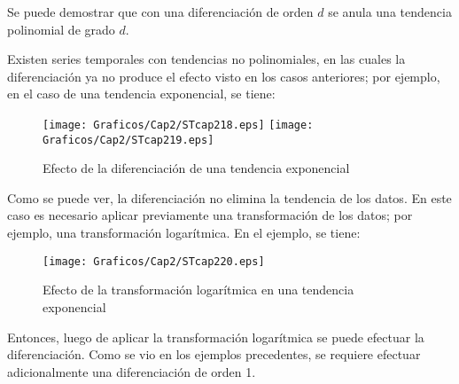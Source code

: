 \begin{observacion}
Se puede demostrar que con una diferenciaci\'{o}n de orden $d$ se anula una tendencia polinomial de grado $d$.
\end{observacion}

\begin{observacion}
Existen series temporales con tendencias no polinomiales, en las cuales la diferenciaci\'{o}n ya no produce el efecto visto en los casos anteriores; por ejemplo, en el caso de una tendencia exponencial, se tiene:
\begin{figure}[H]
\centering
\texttt{[image: Graficos/Cap2/STcap218.eps]}
\texttt{[image: Graficos/Cap2/STcap219.eps]} 
\caption{Efecto de la diferenciaci\'{o}n de una tendencia exponencial}
\end{figure}

Como se puede ver, la diferenciaci\'{o}n no elimina la tendencia de los datos. En este caso es necesario aplicar previamente una transformaci\'{o}n de los datos; por ejemplo, una transformaci\'{o}n logar\'{i}tmica. En el 
ejemplo, se tiene:
\begin{figure}[H]
\centering
\texttt{[image: Graficos/Cap2/STcap220.eps]}
\caption{Efecto de la transformaci\'{o}n logar\'{i}tmica en una tendencia exponencial}
\end{figure}

Entonces, luego de aplicar la transformaci\'{o}n logar\'{i}tmica se puede efectuar la diferenciaci\'{o}n. Como se vio en los ejemplos precedentes, se requiere efectuar adicionalmente una diferenciaci\'{o}n de orden 1. 
\end{observacion}

